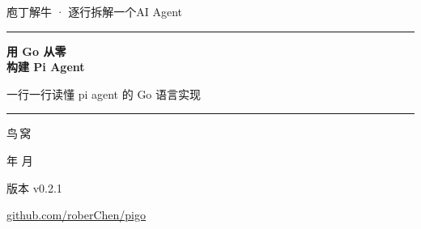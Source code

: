 \begin{titlepage}
\thispagestyle{empty}
\centering
\vspace*{2cm}

{\sffamily\large\color{structurecolor!75} 庖丁解牛 · 逐行拆解一个AI Agent\par}
\vspace{0.5cm}
{\color{accentrule}\rule{0.30\linewidth}{0.8pt}\par}
\vspace{1.5cm}

{\sffamily\bfseries\fontsize{42}{50}\selectfont\color{structurecolor} 用 Go 从零\\[0.25em]构建 Pi Agent\par}
\vspace{1.2cm}

{\Large\sffamily 一行一行读懂 pi agent 的 Go 语言实现\par}

\vspace{1.7cm}
{\color{structurecolor}\rule{0.55\linewidth}{1.4pt}\par}

\vfill

{\LARGE\sffamily 鸟\,窝\par}
\vspace{0.9cm}
{\sffamily\color{black!60} \number\year 年 \number\month 月\par}
\vspace{0.4cm}
{\sffamily\color{structurecolor!85} 版本 v0.2.1\par}
\vspace{0.4cm}
{\small\ttfamily\color{structurecolor} \href{https://github.com/roberChen/pigo}{github.com/roberChen/pigo}\par}
\vspace{1.4cm}
\end{titlepage}
